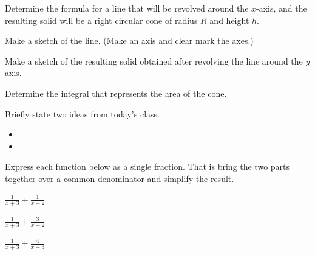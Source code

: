 \begin{problem}
\item Determine the formula for a line that will be revolved
      around the $x$-axis, and the resulting solid will be a right
      circular cone of radius $R$ and height $h$.
  \begin{subproblem}
    \item Make a sketch of the line. (Make an axis and clear mark the
      axes.)
      \vfill

    \item Make a sketch of the resulting solid obtained after
      revolving the line around the $y$ axis.
      \vfill

    \item Determine the integral that represents the area of the cone.
      \vfill

  \end{subproblem}
\end{problem}

\postClass

\begin{problem}
\item Briefly state two ideas from today's class.
  \begin{itemize}
  \item
  \item
  \end{itemize}
\item
  \begin{subproblem}
    \item
  \end{subproblem}
\end{problem}



\begin{problem}
\item Express each function below as a single fraction. That is bring
  the two parts together over a common denominator and simplify the
  result.
  \begin{subproblem}
  \item $\frac{1}{x+3} + \frac{1}{x+2}$
    \vfill
  \item $\frac{1}{x+3} + \frac{3}{x-2}$
    \vfill
  \item $\frac{1}{x+3} + \frac{4}{x-3}$
    \vfill
  \end{subproblem}
\end{problem}


